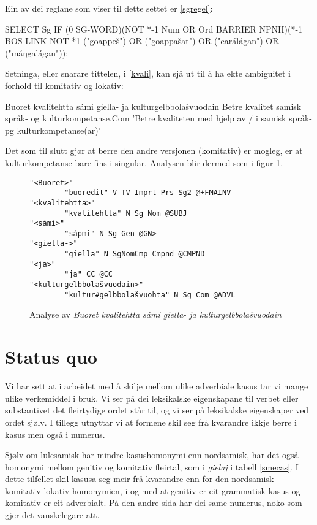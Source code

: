 \documentclass[a4paper,norsk]{article}
\begin{document}
Ein av dei reglane  som viser til dette settet er \ref{sgregel}: %

\begin{example}\label{sgregel}
SELECT Sg IF (0 SG-WORD)(NOT *-1 Num OR Ord BARRIER NPNH)(*-1 BOS LINK NOT *1 ("goappeš") OR ("goappašat") OR ("earálágan") OR ("máŋgalágan"));
\end{example}

Setninga, eller snarare tittelen, i \ref{kvali}, kan sjå ut til å ha ekte ambiguitet i forhold til komitativ og lokativ: %

\begin{example}\label{kvali}
\gll Buoret kvalitehtta sámi giella- ja kulturgelbbolašvuođain
      Betre kvalitet samisk språk- og kulturkompetanse.Com
\glt 'Betre kvaliteten med hjelp av / i samisk språk- pg kulturkompetanse(ar)'
\glend
\end{example}


Det som til slutt gjør at berre den andre versjonen (komitativ) er mogleg, er  at kulturkompetanse bare fins i singular. Analysen blir dermed som i figur \ref{kvalianalyse}.%


\begin{figure}[htbp]
\begin{center}
\begin{verbatim}
"<Buoret>"
        "buoredit" V TV Imprt Prs Sg2 @+FMAINV
"<kvalitehtta>"
        "kvalitehtta" N Sg Nom @SUBJ
"<sámi>"
        "sápmi" N Sg Gen @GN>
"<giella->"
        "giella" N SgNomCmp Cmpnd @CMPND
"<ja>"
        "ja" CC @CC
"<kulturgelbbolašvuođain>"
        "kultur#gelbbolašvuohta" N Sg Com @ADVL
\end{verbatim}
\caption{Analyse av \textit{Buoret kvalitehtta sámi giella- ja kulturgelbbolašvuođain}}
\label{kvalianalyse}
\end{center}
\end{figure}


\section{Status quo}

Vi har sett at i arbeidet med å skilje mellom ulike adverbiale kasus tar vi mange ulike verkemiddel i bruk. Vi ser på dei leksikalske eigenskapane til verbet eller substantivet det fleirtydige ordet står til, og vi ser på leksikalske eigenskaper ved ordet sjølv. I tillegg utnyttar vi at formene skil seg frå kvarandre ikkje berre i kasus men også i numerus. %

Sjølv om lulesamisk har mindre kasushomonymi enn nordsamisk, har det også homonymi mellom genitiv og komitativ fleirtal, som i \textit{gielaj} i tabell \ref{smecas}. I dette tilfellet skil kasusa seg meir frå kvarandre enn for den nordsamisk komitativ-lokativ-homonymien, i og med at genitiv er eit grammatisk kasus og komitativ er eit adverbialt. På den andre sida har dei same numerus, noko som gjer det vanskelegare att. %
\end{document}
